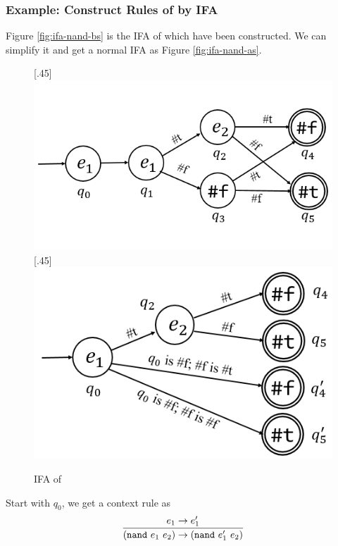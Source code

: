 \subsubsection{Example: Construct Rules of  by IFA}

Figure \ref{fig:ifa-nand-bs} is the IFA of  which have been constructed. We can simplify it and get a normal IFA as Figure \ref{fig:ifa-nand-as}.

\begin{figure}[t]
\centering
{}[.45\linewidth]{
    \includegraphics[scale=0.28]{images/ifa/ifa-nand-4.png}
}
[.45\linewidth]{
    \includegraphics[scale=0.28]{images/ifa/ifa-nand.png}
}
\caption{IFA of }
\label{fig:ifa-nand-std}
\end{figure}

Start with $q_0$, we get a context rule as
\[
\infer{(\m{nand}~e_1~e_2) \to (\m{nand}~e_1'~e_2)}{e_1 \to e_1'}
\]

